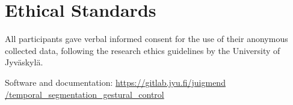 \documentclass{nime-alternate_ADJ} %
\begin{document}

\section{Ethical Standards}
All participants gave verbal informed consent for the use of their anonymous collected data, following the research ethics guidelines by the 
University of Jyväskylä.

%


	 

%
%
\appendix
Software and documentation: 
\href{https://gitlab.jyu.fi/juigmend/temporal_segmentation_gestural_control}{https://gitlab.jyu.fi/juigmend\\/temporal\_segmentation\_gestural\_control}
\end{document}
